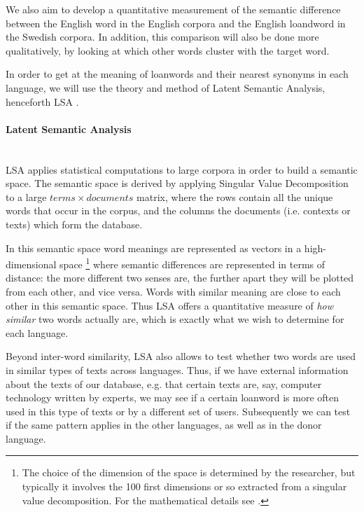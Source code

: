 \documentclass[a4paper]{article}
\begin{document}
We also aim to develop a quantitative measurement of the semantic difference between the English word in the English corpora and the English loandword in the Swedish corpora. In addition, this comparison will also be done more qualitatively, by looking at which other words cluster with the target word. 

In order to get at the meaning of loanwords and their nearest synonyms in each language, we will use the theory and method of Latent Semantic Analysis, henceforth LSA \citep[cf.][]{Deerwester1990,Landauer1998,Dumais2004}.

\paragraph{Latent Semantic Analysis} \hspace{0pt} \\
LSA applies statistical computations to large corpora in order to build a semantic space.
The semantic space is derived by applying Singular Value Decomposition to a large $ terms \times documents$ matrix, where the rows contain all the unique words that occur in the corpus, and the columns the documents (i.e. contexts or texts) which form the database.

In this semantic space word meanings are represented as vectors in a high-dimensional space%
\footnote{The choice of the dimension of the space is determined by the researcher, but typically it involves the 100 first dimensions or so extracted from a singular value decomposition. For the mathematical details see \citet{Deerwester1990}.} where semantic differences are represented in terms of distance: the more different two senses are, the further apart they will be plotted from each other, and vice versa. Words with similar meaning are close to each other in this semantic space.
Thus LSA offers a quantitative measure of \emph{how similar} two words actually are, which is exactly what we wish to determine for each language.

Beyond inter-word similarity, LSA also allows  to test whether two words are used in similar types of texts across languages.
Thus, if we have external information about the texts of our database, e.g. that certain texts are, say, computer technology written by experts, we may see if a certain loanword is more often used in this type of texts or by a different set of users.
Subsequently we can test if the same pattern applies in the other languages, as well as in the donor language.
\end{document}
